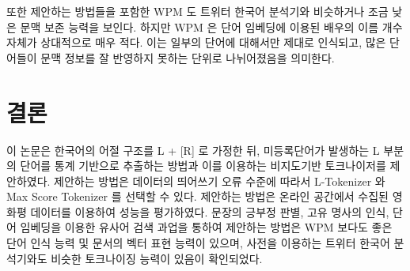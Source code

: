 \documentclass[oneside, ko,phd]{snuthesis_utf8_kor}
\begin{document}
\begin{table}[ht]
\centering
\caption{단어 임베딩 벡터를 이용하여 검색된 배우 이름의 유사어 중 배우 이름인 비율}
\label{tab:word2vec_actor}
\end{table}

또한 제안하는 방법들을 포함한 WPM 도 트위터 한국어 분석기와 비슷하거나 조금 낮은 문맥 보존 능력을 보인다.
하지만 WPM 은 단어 임베딩에 이용된 배우의 이름 개수 자체가 상대적으로 매우 적다.
이는 일부의 단어에 대해서만 제대로 인식되고, 많은 단어들이 문맥 정보를 잘 반영하지 못하는 단위로 나뉘어졌음을 의미한다.


\section{결론}
이 논문은 한국어의 어절 구조를 L + [R] 로 가정한 뒤, 미등록단어가 발생하는 L 부분의 단어를 통계 기반으로 추출하는 방법과 이를 이용하는 비지도기반 토크나이저를 제안하였다.
제안하는 방법은 데이터의 띄어쓰기 오류 수준에 따라서 L-Tokenizer 와 Max Score Tokenizer 를 선택할 수 있다.
제안하는 방법은 온라인 공간에서 수집된 영화평 데이터를 이용하여 성능을 평가하였다.
문장의 긍부정 판별, 고유 명사의 인식, 단어 임베딩을 이용한 유사어 검색 과업을 통하여 제안하는 방법은 WPM 보다도 좋은 단어 인식 능력 및 문서의 벡터 표현 능력이 있으며, 사전을 이용하는 트위터 한국어 분석기와도 비슷한 토크나이징 능력이 있음이 확인되었다.
\end{document}
